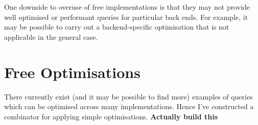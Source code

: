 \documentclass{report}
\newcommand \2[0]{\textbf{2}}
\newcommand \3[0]{\textbf{3}}
\newcommand{\todo}[1]{\textbf{#1}}
\begin{document}
One downside to overuse of free implementations is that they may not provide well optimised or performant queries for particular back ends. For example, it may be possible to carry out a backend-specific optimisation that is not applicable in the general case.

\chapter{Free Optimisations}
There currently exist (and it may be possible to find more) examples of queries which can be optimised across many implementations. Hence I've constructed a combinator for applying simple optimisations. \todo{Actually build this}
    
\end{document}
